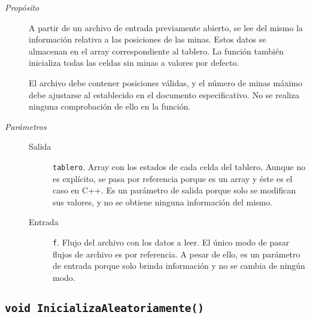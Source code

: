 \documentclass[12pt]{article}
\begin{document}
\begin{description}

\item[\emph{Propósito}]

A partir de un archivo de entrada previamente abierto, se lee del mismo la
información relativa a las posiciones de las minas. Estos datos se almacenan en
el array correspondiente al tablero. La función también inicializa todas las
celdas sin minas a valores por defecto.

El archivo debe contener posiciones válidas, y el número de minas máximo debe
ajustarse al establecido en el documento especificativo. No se realiza ninguna
comprobación de ello en la función.

\item[\emph{Parámetros}] \leavevmode

\begin{description}

\item[Salida] \texttt{tablero}. Array con los estados de cada celda del
tablero. Aunque no es explícito, se pasa por referencia porque es un array y
éste es el caso en C++. Es un parámetro de salida porque solo se modifican sus
valores, y no se obtiene ninguna información del mismo.

\item[Entrada] \texttt{f}. Flujo del archivo con los datos a leer. El
único modo de pasar flujos de archivo es por referencia. A pesar de ello, es un
parámetro de entrada porque solo brinda información y no se cambia de ningún
modo.

\end{description}

\end{description}

\subsection*{\texttt{void InicializaAleatoriamente()}}
\end{document}
